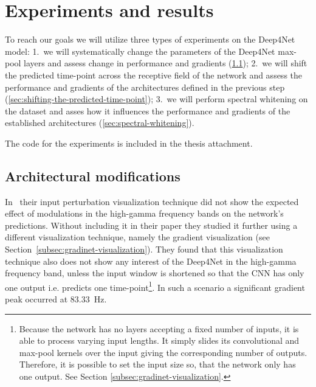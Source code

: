 \chapter{Experiments and results}
\label{ch:exp}

To reach our goals we will utilize three types of experiments on the Deep4Net model:
1.~we will systematically change the parameters of the Deep4Net max-pool layers and assess change in performance and gradients (\ref{sec:architectural-modifications}); 2.~we will shift the predicted time-point across the receptive field of the network and assess the performance and gradients of the architectures defined in the previous step (\ref{sec:shifting-the-predicted-time-point}); 3.~we will perform spectral whitening on the dataset and asses how it influences the performance and gradients of the established architectures (\ref{sec:spectral-whitening}). 

The code for the experiments is included in the thesis attachment. 

\section{Architectural modifications}\label{sec:architectural-modifications}
In~\cite{Hammer-2021} their input perturbation visualization technique did not show the expected effect of modulations in the high-gamma frequency bands on the network's predictions.
Without including it in their paper they studied it further using a different visualization technique, namely the gradient visualization (see Section~\ref{subsec:gradinet-visualization}). 
They found that this visualization technique also does not show any interest of the Deep4Net in the high-gamma frequency band, unless the input window is shortened so that the CNN has only one output i.e. predicts one time-point\footnote{Because the network has no layers accepting a fixed number of inputs, it is able to process varying input lengths. It simply slides its convolutional and max-pool kernels over the input giving the corresponding number of outputs. Therefore, it is possible to set the input size so, that the network only has one output. See Section \ref{subsec:gradinet-visualization}.}.
In such a scenario a significant gradient peak occurred at 83.33~Hz.


